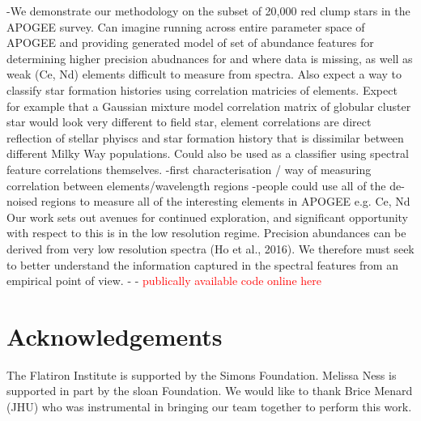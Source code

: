 \documentclass[a4paper,fleqn,usenatbib]{mnras}
\begin{document}
-We demonstrate our methodology on the subset of 20,000 red clump stars in the APOGEE survey. Can imagine running across entire parameter space of APOGEE and providing generated model of set of abundance features for determining higher precision abudnances for and where data is missing, as well as weak (Ce, Nd) elements difficult to measure from spectra. Also expect a way to classify star formation histories using correlation matricies of elements. Expect for example that a Gaussian mixture model correlation matrix of globular cluster star would look very different to field star, element correlations are direct reflection of stellar phyiscs and star formation history that is dissimilar between different Milky Way populations. Could also be used as a classifier using spectral feature correlations themselves. 
-first characterisation / way of measuring correlation between elements/wavelength regions
-people could use all of the de-noised regions to measure all of the interesting elements in APOGEE e.g. Ce, Nd
Our work sets out avenues for continued exploration, and significant opportunity with respect to this is in the low resolution regime. Precision abundances can be derived from very low resolution spectra (Ho et al., 2016). We therefore must seek to better understand the information captured in the spectral features from an empirical point of view. 
-
- \textcolor{red}{publically available code online here} 



\section*{Acknowledgements}

The Flatiron Institute is supported by the Simons Foundation.
Melissa Ness is supported in part by the sloan Foundation. We would like to thank Brice Menard (JHU) who was instrumental in bringing our team together to perform this work. 






\bsp	%
\label{lastpage}
\end{document}
